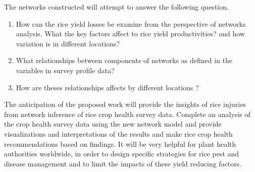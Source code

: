 The networks constructed will attempt to answer the following question. 
\begin{enumerate}

\item How can the rice yield losses be examine from the perspective of networks analysis. What the key factors affect to rice yield productivities? and how variation is in different locations?  
\item What relationships between components of networks as defined in the variables in survey profile data? 
\item How are theses relationships affects by different locations ?

\end{enumerate}
The anticipation of the proposed work will provide the insights of rice injuries from network inference of rice crop health survey data. Complete an analysis of the crop health survey data using the new network model and provide visualizations and interpretations of the results and make rice crop health recommendations based on findings. It will be very helpful for plant health authorities worldwide, in order to design specific strategies for rice pest and disease management and to limit the impacts of these yield reducing factors.
 

